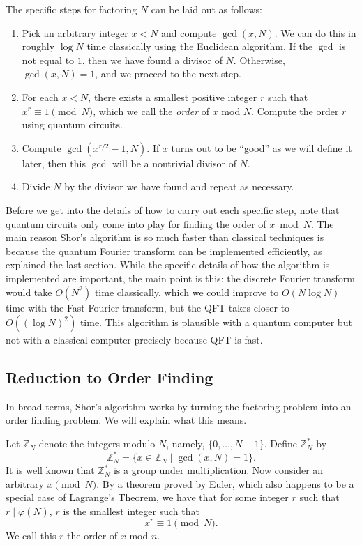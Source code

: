 \documentclass[a4paper]{article}
\newcommand\0{\mathbf{0}}
\newcommand\ZZ{\mathbb{Z}}
\newcommand\<{\langle}
\renewcommand\>{\rangle}
\begin{document}
The specific steps for factoring $N$ can be laid out as follows:

\begin{enumerate}
\item Pick an arbitrary integer $x<N$ and compute $\gcd(x,N)$. We can do this in roughly $\log N$ time classically using the Euclidean algorithm. If the $\gcd$ is not equal to $1$, then we have found a divisor of $N$. Otherwise, $\gcd(x,N)=1$, and we proceed to the next step.
\item For each $x<N$, there exists a smallest positive integer $r$ such that $x^r\equiv 1\pmod{N}$, which we call the \textit{order} of $x$ mod $N$. Compute the order $r$ using quantum circuits.
\item Compute $\gcd(x^{r/2}-1, N)$. If $x$ turns out to be ``good'' as we will define it later, then this $\gcd$ will be a nontrivial divisor of $N$. 
\item Divide $N$ by the divisor we have found and repeat as necessary.
\end{enumerate}

Before we get into the details of how to carry out each specific step, note that quantum circuits only come into play for finding the order of $x\bmod{N}$. The main reason Shor's algorithm is so much faster than classical techniques is because the quantum Fourier transform can be implemented efficiently, as explained the last section. While the specific details of how the algorithm is implemented are important, the main point is this: the discrete Fourier transform would take $O(N^2)$ time classically, which we could improve to $O(N\log N)$ time with the Fast Fourier transform, but the QFT takes closer to $O((\log N)^2)$ time. This algorithm is plausible with a quantum computer but not with a classical computer precisely because QFT is fast.

\subsection{Reduction to Order Finding}

In broad terms, Shor's algorithm works by turning the factoring problem into an order finding problem. We will explain what this means.

Let $\ZZ_N$ denote the integers modulo $N$, namely, $\{0,\ldots,N-1\}$. Define $\ZZ_N^*$ by $$\ZZ_N^* = \{x\in \ZZ_N \mid \gcd(x,N) = 1\}.$$ It is well known that $\ZZ_N^*$ is a group under multiplication. Now consider an arbitrary $x\pmod{N}$. By a theorem proved by Euler, which also happens to be a special case of Lagrange's Theorem, we have that for some integer $r$ such that $r \mid \varphi(N)$, $r$ is the smallest integer such that $$x^r \equiv 1\pmod{N}.$$ We call this $r$ the order of $x$ mod $n$. 
\end{document}

